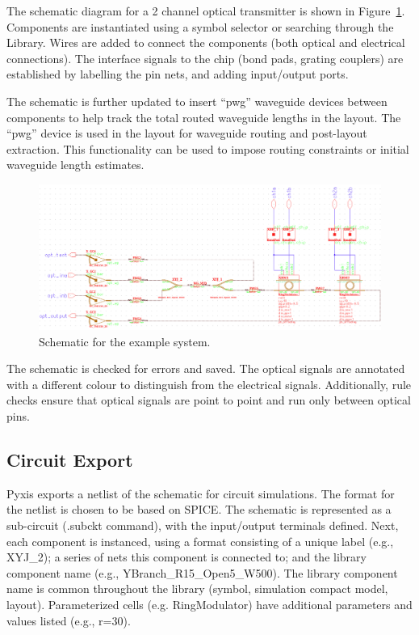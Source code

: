 \documentclass[journal]{spie}
\begin{document}
The schematic diagram for a 2 channel optical transmitter is shown in Figure~\ref{schematic_wdm2tx}.  Components are instantiated using a symbol selector or searching through the Library.  Wires are added to connect the components (both optical and electrical connections).  The interface signals to the chip (bond pads, grating couplers) are established by labelling the pin nets, and adding input/output ports.   

The schematic is further updated to insert ``pwg'' waveguide devices between components to help track the total routed waveguide lengths in the layout.  The ``pwg'' device is used in the layout for waveguide routing and post-layout extraction.  This functionality can be used to impose routing constraints or initial waveguide length estimates.

\begin{figure}[tbp]
\centering
 \includegraphics[width=1\linewidth]{../figs/schematic_wdm2tx}
\caption{Schematic for the example system.}
\label{schematic_wdm2tx}
\end{figure}

The schematic is checked for errors and saved.  The optical signals are annotated with a different colour to distinguish from the electrical signals.  Additionally, rule checks ensure that optical signals are  point to point and run only between optical pins.  



\subsection{Circuit Export}  

Pyxis exports a netlist of the schematic for circuit simulations.  The format for the netlist is chosen to be based on SPICE.  The schematic is represented as a sub-circuit (.subckt command), with the input/output terminals defined.  Next, each component is instanced, using a format consisting of a unique label (e.g., XYJ\_2); a series of nets this component is connected to; and the library component name (e.g., YBranch\_R15\_Open5\_W500).  The library component name is common throughout the library (symbol, simulation compact model, layout).  Parameterized cells (e.g. RingModulator) have additional parameters and values listed (e.g., r=30).
\end{document}
